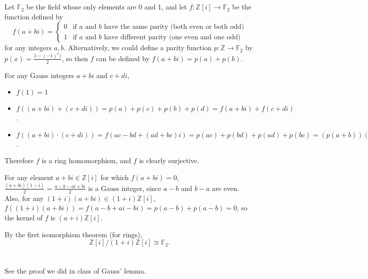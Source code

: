 \documentclass[12pt]{article}
\begin{document}
\section{}
\noindent{}\bigskip\par
Let $\mathbb{F}_2$ be the field whose only elements are 0 and 1, and let $f: \mathbb{Z}[i] \rightarrow \mathbb{F}_2$ be the function defined by
\[ f(a+bi) = \begin{cases}
    0 & \text{if $a$ and $b$ have the same parity (both even or both odd)} \\
    1 & \text{if $a$ and $b$ have different parity (one even and one odd)}
\end{cases} \]
for any integers $a, b$. Alternatively, we could define a parity function $p: \mathbb{Z} \rightarrow \mathbb{F}_2$ by $p(x)= \frac{1-(-1)^x)}{2}$, so then $f$ can be defined by $f(a+bi)=p(a)+p(b)$.
\par
For any Gauss integers $a+bi$ and $c+di$,
\begin{itemize}
    \item $f(1)=1$
    \item $f((a+bi)+(c+di))=p(a)+p(c)+p(b)+p(d)=f(a+bi)+f(c+di)$.
    \item $f((a+bi) \cdot (c+di)) = f(ac-bd+(ad+bc)i)=p(ac)+p(bd)+p(ad)+p(bc)=(p(a+b))(p(c+d))=f(a+bi)f(c+di)$.
\end{itemize}
Therefore $f$ is a ring homomorphism, and $f$ is clearly surjective.
\par
For any element $a+bi \in \mathbb{Z}[i]$ for which $f(a+bi)=0$, $\frac{(a+bi)(1-i)}{2} = \frac{a-b-ai+bi}{2}$ is a Gauss integer, since $a-b$ and $b-a$ are even. Also, for any $(1+i)(a+bi) \in (1+i) \mathbb{Z}[i]$, $f((1+i)(a+bi))= f(a-b+ai-bi)=p(a-b)+p(a-b)=0$, so the kernel of $f$ is $(a+i)\mathbb{Z}[i]$.
\par
By the first isomorphism theorem (for rings),
\[ \mathbb{Z}[i]/(1+i)\mathbb{Z}[i] \cong \mathbb{F}_2. \]

\section{}
\noindent{}\bigskip\par
See the proof we did in class of Gauss' lemma.
\end{document}
